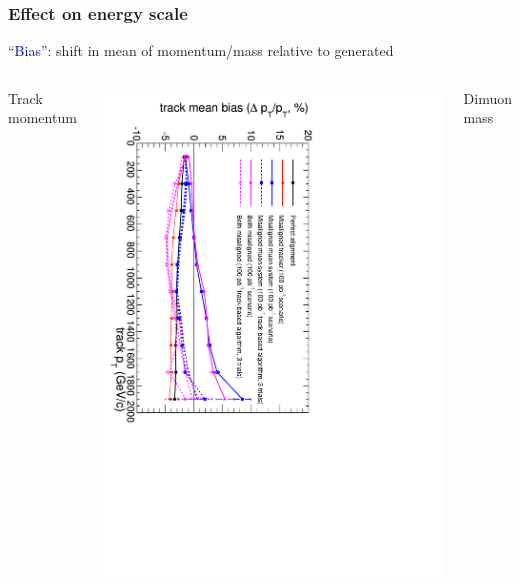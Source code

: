 \documentclass[compress]{beamer}
\begin{document}
\begin{frame}
\frametitle{Effect on energy scale}

\textcolor{darkblue}{``Bias'':} shift in mean of momentum/mass relative to generated

\vspace{-0.25 cm}
\begin{columns}
\begin{center} Track momentum \end{center}

\vspace{-0.25 cm}
\includegraphics[height=1.1\linewidth, angle=90]{ZSSM_Align_TrackBias_color-100.pdf}
\begin{center} Dimuon mass \end{center}


\end{columns}
\end{frame}
\end{document}
